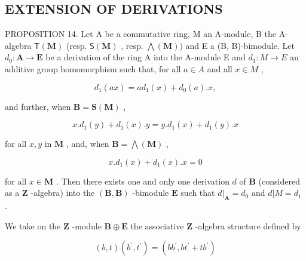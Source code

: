 \subsection{EXTENSION OF DERIVATIONS}

PROPOSITION 14. Let A be a commutative ring, M an A-module, B the A-algebra \(\mathsf{T}(\mathbf{M})\) (resp. \(\mathsf{S}(\mathbf{M})\) , resp. \(\bigwedge (\mathbf{M}))\) and E a (B, B)-bimodule. Let \(d_0: \mathbf{A} \to \mathbf{E}\) be a derivation of the ring A into the A-module E and \(d_{1}:M\to E\) an additive group homomorphism such that, for all \(a\in A\) and all \(x\in M\) ,

\[
d _ {1} (a x) = a d _ {1} (x) + d _ {0} (a). x,\tag{29}
\]

and further, when \(\mathbf{B} = \mathbf{S}(\mathbf{M})\) ,

\[
x. d _ {1} (y) + d _ {1} (x). y = y. d _ {1} (x) + d _ {1} (y). x\tag{30}
\]

for all \(x, y\) in \(\mathbf{M}\) , and, when \(\mathbf{B} = \bigwedge (\mathbf{M})\) ,

\[
x. d _ {1} (x) + d _ {1} (x). x = 0\tag{31}
\]

for all \(x \in \mathbf{M}\) . Then there exists one and only one derivation \(d\) of \(\mathbf{B}\) (considered as a \(\mathbf{Z}\) -algebra) into the \((\mathbf{B}, \mathbf{B})\) -bimodule \(\mathbf{E}\) such that \(d|_{\mathbf{A}} = d_0\) and \(d|M = d_1\) .

We take on the \(\mathbf{Z}\) -module \(\mathbf{B} \oplus \mathbf{E}\) the associative \(\mathbf{Z}\) -algebra structure defined by

\[
(b, t) (b ^ {\prime}, t ^ {\prime}) = (b b ^ {\prime}, b t ^ {\prime} + t b ^ {\prime})
\]

